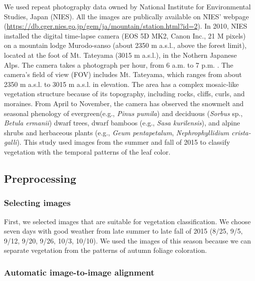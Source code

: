 \documentclass{article}
\begin{document}
We used repeat photography data owned by National Institute for Environmental Studies, Japan (NIES). All the images are publically available on NIES' webpage (\url{https://db.cger.nies.go.jp/gem/ja/mountain/station.html?id=2}). In 2010, NIES installed the digital time-lapse camera (EOS 5D MK2, Canon Inc., 21 M pixels) on a mountain lodge Murodo-sanso (about 2350 m a.s.l., above the forest limit), located at the foot of Mt. Tateyama (3015 m a.s.l.), in the Nothern Japanese Alps. The camera takes a photograph per hour, from 6 a.m. to 7 p.m. . The camera's field of view (FOV) includes Mt. Tateyama, which ranges from about 2350 m a.s.l. to 3015 m a.s.l. in elevation. The area has a complex mosaic-like vegetation structure because of its topography, including rocks, cliffs, curls, and moraines. From April to November, the camera has observed the snowmelt and seasonal phenology of evergreen(e.g., \emph{Pinus pumila}) and deciduous (\emph{Sorbus} sp., \emph{Betula ermanii}) dwarf trees, dwarf bamboos (e.g., \emph{Sasa kurilensis}), and alpine shrubs and herbaceous plants (e.g., \emph{Geum pentapetalum}, \emph{Nephrophyllidium crista-galli}). This study used images from the summer and fall of 2015 to classify vegetation with the temporal patterns of the leaf color.

\hypertarget{preprocessing}{%
\subsection{Preprocessing}\label{preprocessing}}

\hypertarget{selecting-images}{%
\subsubsection{Selecting images}\label{selecting-images}}

First, we selected images that are suitable for vegetation classification. We choose seven days with good weather from late summer to late fall of 2015 (8/25, 9/5, 9/12, 9/20, 9/26, 10/3, 10/10). We used the images of this season because we can separate vegetation from the patterns of autumn foliage coloration.

\hypertarget{automatic-image-to-image-alignment}{%
\subsubsection{Automatic image-to-image alignment}\label{automatic-image-to-image-alignment}}
\end{document}

